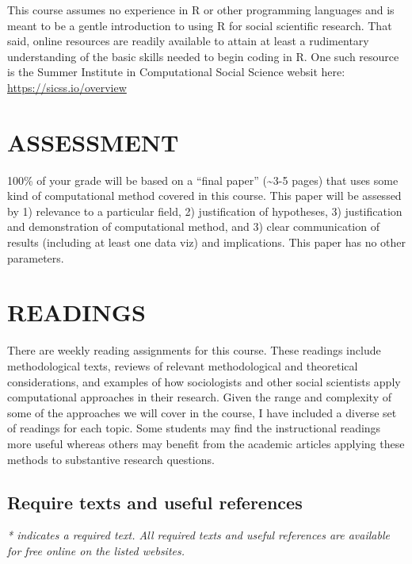 \documentclass[
  10pt,
]{article}
\begin{document}
This course assumes no experience in R or other programming languages
and is meant to be a gentle introduction to using R for social
scientific research. That said, online resources are readily available
to attain at least a rudimentary understanding of the basic skills
needed to begin coding in R. One such resource is the Summer Institute
in Computational Social Science websit here:
\url{https://sicss.io/overview}

\hypertarget{assessment}{%
\section{ASSESSMENT}\label{assessment}}

100\% of your grade will be based on a ``final paper''
(\textasciitilde3-5 pages) that uses some kind of computational method
covered in this course. This paper will be assessed by 1) relevance to a
particular field, 2) justification of hypotheses, 3) justification and
demonstration of computational method, and 3) clear communication of
results (including at least one data viz) and implications. This paper
has no other parameters.

\hypertarget{readings}{%
\section{READINGS}\label{readings}}

There are weekly reading assignments for this course. These readings
include methodological texts, reviews of relevant methodological and
theoretical considerations, and examples of how sociologists and other
social scientists apply computational approaches in their research.
Given the range and complexity of some of the approaches we will cover
in the course, I have included a diverse set of readings for each topic.
Some students may find the instructional readings more useful whereas
others may benefit from the academic articles applying these methods to
substantive research questions.

\hypertarget{require-texts-and-useful-references}{%
\subsection{Require texts and useful
references}\label{require-texts-and-useful-references}}

\emph{* indicates a required text. All required texts and useful
references are available for free online on the listed websites.}
\end{document}
